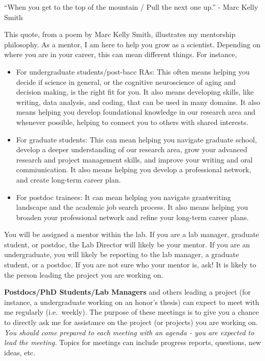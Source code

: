 \documentclass[
]{book}
\begin{document}
``When you get to the top of the mountain / Pull the next one up.'' - Marc Kelly Smith

This quote, from a poem by Marc Kelly Smith, illustrates my mentorship philosophy. As a mentor, I am here to help you grow as a scientist. Depending on where you are in your career, this can mean different things. For instance,

\begin{itemize}
\item
  For undergraduate students/post-bacc RAs: This often means helping you decide if science in general, or the cognitive neuroscience of aging and decision making, is the right fit for you. It also means developing skills, like writing, data analysis, and coding, that can be used in many domains. It also means helping you develop foundational knowledge in our research area and whenever possible, helping to connect you to others with shared interests.
\item
  For graduate students: This can mean helping you navigate graduate school, develop a deeper understanding of our research area, grow your advanced research and project management skills, and improve your writing and oral commiunication. It also means helping you develop a professional network, and create long-term career plan.
\item
  For postdoc trainees: It can mean helping you navigate grantwriting landscape and the academic job search process. It also means helping you broaden your professional network and refine your long-term career plans.
\end{itemize}

You will be assigned a mentor within the lab. If you are a lab manager, graduate student, or postdoc, the Lab Director will likely be your mentor. If you are an undergraduate, you will likely be reporting to the lab manager, a graduate student, or a postdoc. If you are not sure who your mentor is, ask! It is likely to the person leading the project you are working on.

\textbf{Postdocs/PhD Students/Lab Managers} and others leading a project (for instance, a undergraduate working on an honor's thesis) can expect to meet with me regularly (i.e.~weekly). The purpose of these meetings is to give you a chance to directly ask me for assistance on the project (or projects) you are working on. \emph{You should come prepared to each meeting with an agenda - you are expected to lead the meeting.} Topics for meetings can include progress reports, questions, new ideas, etc.
\end{document}
